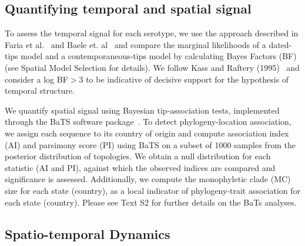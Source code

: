 \documentclass[10pt]{article}
\begin{document}
\subsection*{Quantifying temporal and spatial signal} 

To assess the temporal signal for each serotype, we use the approach described in Faria et al.~\cite{Faria2012} and Baele et. al~\cite{Baele2012} and compare the marginal likelihoods of a dated-tips model and a contemporaneous-tips model by calculating Bayes Factors (BF)~\cite{Suchard2001, Suchard2005} (see Spatial Model Selection for details).
We follow Kass and Raftery (1995)~\cite{KassRaftery1995} and consider a log BF$>$3 to be indicative of decisive support for the hypothesis of temporal structure.

We quantify spatial signal using Bayesian tip-association tests, implemented through the BaTS software package~\cite{Parker2008}.
To detect phylogeny-location association, we assign each sequence to its country of origin and compute association index (AI) and parsimony score (PI) using BaTS on a subset of 1000 samples from the posterior distribution of topologies.
We obtain a null distribution for each statistic (AI and PI), against which the observed indices are compared and significance is assessed.
Additionally, we compute the monophyletic clade (MC) size for each state (country), as a local indicator of phylogeny-trait association for each state (country).
Please see Text S2 for further details on the BaTs analyses.

\subsection*{Spatio-temporal Dynamics}
\end{document}
